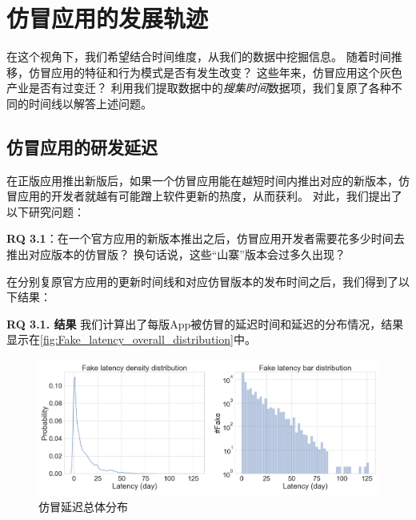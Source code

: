 \section{仿冒应用的发展轨迹}
在这个视角下，我们希望结合时间维度，从我们的数据中挖掘信息。
随着时间推移，仿冒应用的特征和行为模式是否有发生改变？
这些年来，仿冒应用这个灰色产业是否有过变迁？
利用我们提取数据中的\emph{搜集时间}数据项，我们复原了各种不同的时间线以解答上述问题。

\subsection{仿冒应用的研发延迟}
在正版应用推出新版后，如果一个仿冒应用能在越短时间内推出对应的新版本，仿冒应用的开发者就越有可能蹭上软件更新的热度，从而获利。
对此，我们提出了以下研究问题：

{\bf RQ 3.1}：在一个官方应用的新版本推出之后，仿冒应用开发者需要花多少时间去推出对应版本的仿冒版？
换句话说，这些``山寨''版本会过多久出现？

在分别复原官方应用的更新时间线和对应仿冒版本的发布时间之后，我们得到了以下结果：

{\bf RQ 3.1. 结果}
我们计算出了每版App被仿冒的延迟时间和延迟的分布情况，结果显示在\autoref{fig:Fake_latency_overall_distribution}中。

\begin{figure}
	\centering
	\includegraphics[width=\textwidth]{./Figures/edwin-Fake_latency_overall_distribution2.png}
	\caption{仿冒延迟总体分布}
	\label{fig:Fake_latency_overall_distribution}
\end{figure}

